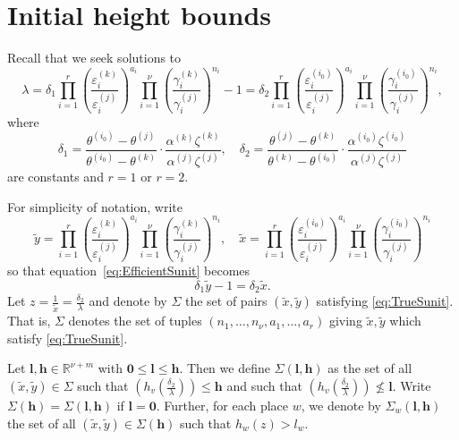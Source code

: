\section{Initial height bounds}

Recall that we seek solutions to
\begin{equation*}
\lambda = \delta_1 \prod_{i = 1}^r\left( \frac{\varepsilon_i^{(k)}}{\varepsilon_i^{(j)}}\right)^{a_i}\prod_{i = 1}^{\nu} \left( \frac{\gamma_i^{(k)}}{\gamma_i^{(j)}}\right)^{n_i} - 1 = \delta_2 \prod_{i = 1}^{r}\left( \frac{\varepsilon_i^{(i_0)}}{\varepsilon_i^{(j)}}\right)^{a_i} \prod_{i = 1}^{\nu} \left( \frac{\gamma_i^{(i_0)}}{\gamma_i^{(j)}}\right)^{n_i},
\end{equation*}
where
\[\delta_1 = \frac{\theta^{(i_0)} - \theta^{(j)}}{\theta^{(i_0)} - \theta^{(k)}}\cdot\frac{\alpha^{(k)}\zeta^{(k)}}{\alpha^{(j)}\zeta^{(j)}}, \quad \delta_2 = \frac{\theta^{(j)} - \theta^{(k)}}{\theta^{(k)} - \theta^{(i_0)}}\cdot \frac{\alpha^{(i_0)}\zeta^{(i_0)}}{\alpha^{(j)}\zeta^{(j)}}\]
are constants and $r = 1$ or $r = 2$. 

For simplicity of notation, write
\[\tilde{y} =  \prod_{i = 1}^r\left( \frac{\varepsilon_i^{(k)}}{\varepsilon_i^{(j)}}\right)^{a_i}\prod_{i = 1}^{\nu} \left( \frac{\gamma_i^{(k)}}{\gamma_i^{(j)}}\right)^{n_i}, \quad 
\tilde{x} = \prod_{i = 1}^{r}\left( \frac{\varepsilon_i^{(i_0)}}{\varepsilon_i^{(j)}}\right)^{a_i} \prod_{i = 1}^{\nu} \left( \frac{\gamma_i^{(i_0)}}{\gamma_i^{(j)}}\right)^{n_i}\]
so that equation~\eqref{eq:EfficientSunit} becomes
\begin{equation} \label{eq:TrueSunit}
\delta_1\tilde{y} - 1 = \delta_2\tilde{x}.
\end{equation}
Let $z= \frac{1}{\tilde{x}} = \frac{\delta_2}{\lambda}$ and denote by $\Sigma$ the set of pairs $(\tilde{x},\tilde{y})$ satisfying \eqref{eq:TrueSunit}. That is, $\Sigma$ denotes the set of tuples $(n_1, \dots, n_{\nu}, a_1, \dots, a_r)$ giving $\tilde{x},\tilde{y}$ which satisfy \eqref{eq:TrueSunit}.

Let $\mathbf{l},\mathbf{h}\in\mathbb{R}^{\nu + m}$ with $\mathbf{0}\leq \mathbf{l}\leq \mathbf{h}$. Then we define $\Sigma(\mathbf{l},\mathbf{h})$ as the set of all $(\tilde{x},\tilde{y}) \in \Sigma$ such that $\left(h_v\left(\frac{\delta_2}{\lambda}\right)\right)\leq \mathbf{h}$ and such that $\left(h_v\left(\frac{\delta_2}{\lambda}\right)\right)\nleq \mathbf{l}$. Write $\Sigma(\mathbf{h})=\Sigma(\mathbf{l},\mathbf{h})$ if $\mathbf{l}=\mathbf{0}$. Further, for each place $w$, we denote by $\Sigma_w(\mathbf{l},\mathbf{h})$ the set of all $(\tilde{x},\tilde{y})\in\Sigma(\mathbf{h})$ such that $h_w(z)>l_w$. 

